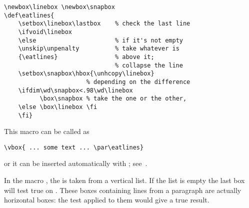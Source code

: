 \documentclass{book}
\begin{document}
\begin{verbatim}
\newbox\linebox \newbox\snapbox
\def\eatlines{
    \setbox\linebox\lastbox    % check the last line
    \ifvoid\linebox
    \else                      % if it's not empty
    \unskip\unpenalty          % take whatever is
    {\eatlines}                % above it;
                               % collapse the line
    \setbox\snapbox\hbox{\unhcopy\linebox}
                       % depending on the difference
    \ifdim\wd\snapbox<.98\wd\linebox
          \box\snapbox % take the one or the other,
    \else \box\linebox \fi
    \fi}
\end{verbatim}
This macro can be called as
\begin{verbatim}
\vbox{ ... some text ... \par\eatlines}
\end{verbatim}
or it can be inserted automatically
with ; see~\cite{E1}.

In the macro , the  is taken
from a vertical list. If the list is empty
the last box will test true on .
These boxes containing lines from a paragraph
are actually horizontal boxes: the test
 applied to them would give a true
result.

\endofchapter
\end{document}
